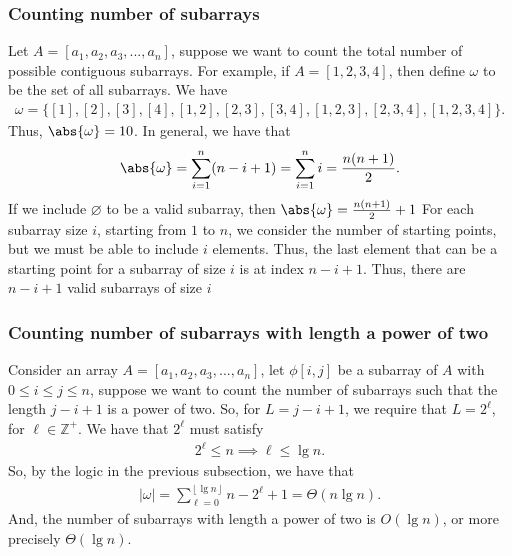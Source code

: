 \documentclass{report}
\begin{document}
    \subsubsection{Counting number of subarrays}
    \bigbreak \noindent 
    Let $A = [a_{1}, a_{2}, a_{3},...,a_{n}] $, suppose we want to count the total number of possible contiguous subarrays. For example, if  $A = [1,2,3,4]$, then define $\omega$ to be the set of all subarrays. We have
    \begin{align*}
        \omega = \{[1],[2],[3],[4], [1,2], [2,3], [3,4], [1,2,3], [2,3,4], [1,2,3,4]\}
    .\end{align*}
    Thus, $\abs{\omega} = 10$. In general, we have that
    \begin{align*}
        \abs{\omega} = \sum_{i=1}^{n} (n-i+1) = \sum_{i=1}^{n} i = \frac{n(n+1)}{2}
    .\end{align*}
    If we include $\varnothing$ to be a valid subarray, then $\abs{\omega} = \frac{n(n+1)}{2} + 1$
    \bigbreak \noindent 
    For each subarray size $i$, starting from $1$ to $n$, we consider the number of starting points, but we must be able to include $i$ elements. Thus, the last element that can be a starting point for a subarray of size $i$ is at index $ n - i + 1$. Thus, there are $n-i+1$ valid subarrays of size $i$

    \bigbreak \noindent 
    \subsubsection{Counting number of subarrays with length a power of two}
    \bigbreak \noindent 
    Consider an array $A = [a_{1}, a_{2}, a_{3},...,a_{n}]$, let $\phi[i,j]$ be a subarray of $A$ with $ 0 \leq i \leq j \leq n$, suppose we want to count the number of subarrays such that the length $j-i + 1$ is a power of two.
    \bigbreak \noindent 
    So, for $ L = j-i+1$, we require that $L = 2^{\ell}$, for $\ell \in \mathbb{Z}^{+}$. We have that $2^{\ell}$ must satisfy
    \begin{align*}
        2^{\ell} \leq n \implies \ell \leq \lg n
    .\end{align*}
    So, by the logic in the previous subsection, we have that 
    \begin{align*}
    \left\lvert \omega \right\rvert     = \sum_{\ell = 0}^{\left\lfloor \lg n \right\rfloor} n - 2^{\ell} +1 = \Theta(n\lg n)
    .\end{align*}
    And, the number of subarrays with length a power of two is $O(\lg n)$, or more precisely $\Theta(\lg n) $.
\end{document}

